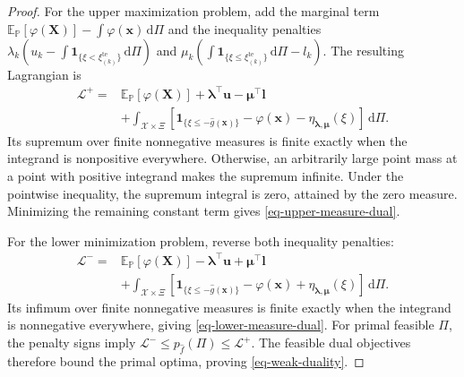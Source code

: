 \documentclass[review,11pt,3p,authoryear,nopreprintline]{elsarticle}
\begin{document}
\begin{proof}
  For the upper maximization problem, add the marginal term
  $\mathbb E_{\mathbb P}[\varphi(\bm X)]-\int\varphi(\bm x)\,\mathrm d\Pi$
  and the inequality penalties
  $\lambda_k(u_k-\int\mathbf1_{\{\xi<\xi_{(k)}^{\mathrm{te}}\}}\,\mathrm d\Pi)$ and
  $\mu_k(\int\mathbf1_{\{\xi\le \xi_{(k)}^{\mathrm{te}}\}}\,\mathrm d\Pi-l_k)$.
  The resulting Lagrangian is \citep[Section~5.1]{B.V04}
  \begin{equation}
    \begin{aligned}
      \mathcal L^+
      ={}&\mathbb E_{\mathbb P}[\varphi(\bm X)]
        +\bm\lambda^\top\bm u-\bm\mu^\top\bm l\\
        &+\int_{\mathcal X\times\Xi}
        [\mathbf1_{\{\xi\le -\hat g(\bm x)\}}
        -\varphi(\bm x)-\eta_{\bm\lambda,\bm\mu}(\xi)]\,\mathrm d\Pi.
    \end{aligned}
    \label{eq-upper-lagrangian}
  \end{equation}
  Its supremum over finite nonnegative measures is finite exactly when the integrand is nonpositive everywhere. Otherwise, an arbitrarily large point mass at a point with positive integrand makes the supremum infinite. Under the pointwise inequality, the supremum integral is zero, attained by the zero measure. Minimizing the remaining constant term gives \eqref{eq-upper-measure-dual}.

  For the lower minimization problem, reverse both inequality penalties:
  \begin{equation}
    \begin{aligned}
      \mathcal L^-
      ={}&\mathbb E_{\mathbb P}[\varphi(\bm X)]
        -\bm\lambda^\top\bm u+\bm\mu^\top\bm l\\
        &+\int_{\mathcal X\times\Xi}
        [\mathbf1_{\{\xi\le -\hat g(\bm x)\}}
        -\varphi(\bm x)+\eta_{\bm\lambda,\bm\mu}(\xi)]\,\mathrm d\Pi.
    \end{aligned}
    \label{eq-lower-lagrangian}
  \end{equation}
  Its infimum over finite nonnegative measures is finite exactly when the integrand is nonnegative everywhere, giving \eqref{eq-lower-measure-dual}. For primal feasible $\Pi$, the penalty signs imply
  $\mathcal L^-\le p_{\hat f}(\Pi)\le\mathcal L^+$.
  The feasible dual objectives therefore bound the primal optima, proving \eqref{eq-weak-duality}.
\end{proof}
\end{document}
